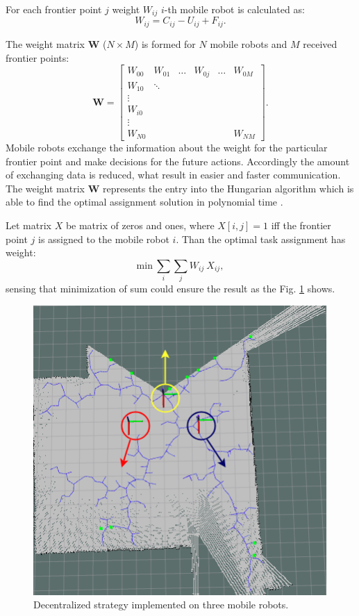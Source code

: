 \documentclass[letterpaper, 10 pt, conference]{ieeeconf}  %
\begin{document}
For each frontier point $j$ weight $W_{ij}$ $i$-th mobile robot is calculated as: 
\begin{equation}
   {W}_{ij}= {C_{ij}} - {U_{ij}} + {F_{ij}}.
   \label{weight}
\end{equation}

The weight matrix $\boldsymbol{W}$ ($N\times M$) is formed for $N$ mobile robots and $M$ received frontier points: 
\begin{equation}
    \boldsymbol{W} = \begin{bmatrix}
    W_{00} & W_{01} & \hdots & W_{0j} & \hdots & W_{0M}\\
    W_{10} & \ddots \\
    \vdots  \\
    W_{i0} \\
    \vdots \\
    W_{N0} &        &     &     &        &    W_{NM}
    \end{bmatrix}.
\end{equation}
Mobile robots exchange the information about the weight for the particular frontier point and make decisions for the future actions. Accordingly the amount of exchanging data is reduced, what result in easier and faster communication.
The weight matrix $\boldsymbol{W}$ represents the entry into the Hungarian algorithm which is able to find the optimal assignment solution in polynomial time \cite{hungarian}. 

Let matrix $X$ be matrix of zeros and ones, where $X[i,j]=1$ iff the frontier point $j$ is assigned to the mobile robot $i$.
Than the optimal task assignment has weight:
\begin{equation}
     {\mathrm{min}}\ \sum_{i} \sum_{j} W_{ij}\ X_{ij},
\end{equation}
sensing that minimization of sum could ensure the result as the Fig. \ref{fig:start} shows. 

\begin{figure}[t!]
	\centering\includegraphics[width=0.9\columnwidth]{start.png}
	\caption {Decentralized strategy implemented on three mobile robots.}
	\label{fig:start}
\end{figure}
\end{document}
